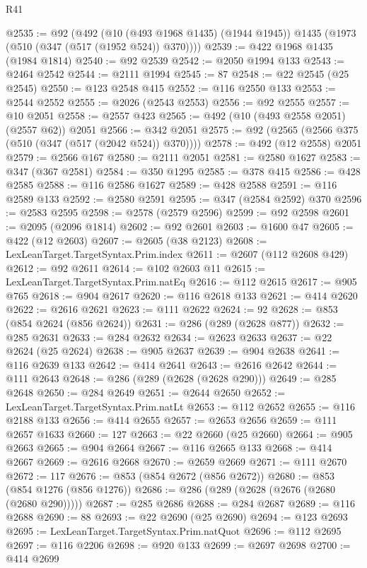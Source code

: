 \begin{lexlean}{R41}
\begin{coremodule}
@2535 := @92
    (@492
      (@10 (@493 @1968 @1435) (@1944 @1945))
      @1435
      (@1973 (@510 (@347 (@517 (@1952 @524)) @370))))
@2539 := @422 @1968 @1435 (@1984 @1814)
@2540 := @92 @2539
@2542 := @2050 @1994 @133
@2543 := @2464 @2542
@2544 := @2111 @1994
@2545 := 87
@2548 := @22 @2545 (@25 @2545)
@2550 := @123 @2548 @415
@2552 := @116 @2550 @133
@2553 := @2544 @2552
@2555 := @2026 (@2543 @2553)
@2556 := @92 @2555
@2557 := @10 @2051
@2558 := @2557 @423
@2565 := @492 (@10 (@493 @2558 @2051) (@2557 @62)) @2051
@2566 := @342 @2051
@2575 := @92 (@2565 (@2566 @375 (@510 (@347 (@517 (@2042 @524)) @370))))
@2578 := @492 (@12 @2558) @2051
@2579 := @2566 @167
@2580 := @2111 @2051
@2581 := @2580 @1627
@2583 := @347 (@367 @2581)
@2584 := @350 @1295
@2585 := @378 @415
@2586 := @428 @2585
@2588 := @116 @2586 @1627
@2589 := @428 @2588
@2591 := @116 @2589 @133
@2592 := @2580 @2591
@2595 := @347 (@2584 @2592) @370
@2596 := @2583 @2595
@2598 := @2578 (@2579 @2596)
@2599 := @92 @2598
@2601 := @2095 (@2096 @1814)
@2602 := @92 @2601
@2603 := @1600 @47
@2605 := @422 (@12 @2603)
@2607 := @2605 (@38 @2123)
@2608 := LexLeanTarget.TargetSyntax.Prim.index
@2611 := @2607 (@112 @2608 @429)
@2612 := @92 @2611
@2614 := @102 @2603 @11
@2615 := LexLeanTarget.TargetSyntax.Prim.natEq
@2616 := @112 @2615
@2617 := @905 @765
@2618 := @904 @2617
@2620 := @116 @2618 @133
@2621 := @414 @2620
@2622 := @2616 @2621
@2623 := @111 @2622
@2624 := 92
@2628 := @853 (@854 @2624 (@856 @2624))
@2631 := @286 (@289 (@2628 @877))
@2632 := @285 @2631
@2633 := @284 @2632
@2634 := @2623 @2633
@2637 := @22 @2624 (@25 @2624)
@2638 := @905 @2637
@2639 := @904 @2638
@2641 := @116 @2639 @133
@2642 := @414 @2641
@2643 := @2616 @2642
@2644 := @111 @2643
@2648 := @286 (@289 (@2628 (@2628 @290)))
@2649 := @285 @2648
@2650 := @284 @2649
@2651 := @2644 @2650
@2652 := LexLeanTarget.TargetSyntax.Prim.natLt
@2653 := @112 @2652
@2655 := @116 @2188 @133
@2656 := @414 @2655
@2657 := @2653 @2656
@2659 := @111 @2657 @1633
@2660 := 127
@2663 := @22 @2660 (@25 @2660)
@2664 := @905 @2663
@2665 := @904 @2664
@2667 := @116 @2665 @133
@2668 := @414 @2667
@2669 := @2616 @2668
@2670 := @2659 @2669
@2671 := @111 @2670
@2672 := 117
@2676 := @853 (@854 @2672 (@856 @2672))
@2680 := @853 (@854 @1276 (@856 @1276))
@2686 := @286 (@289 (@2628 (@2676 (@2680 (@2680 @290)))))
@2687 := @285 @2686
@2688 := @284 @2687
@2689 := @116 @2688
@2690 := 88
@2693 := @22 @2690 (@25 @2690)
@2694 := @123 @2693
@2695 := LexLeanTarget.TargetSyntax.Prim.natQuot
@2696 := @112 @2695
@2697 := @116 @2206
@2698 := @920 @133
@2699 := @2697 @2698
@2700 := @414 @2699

\end{coremodule}
\end{lexlean}
